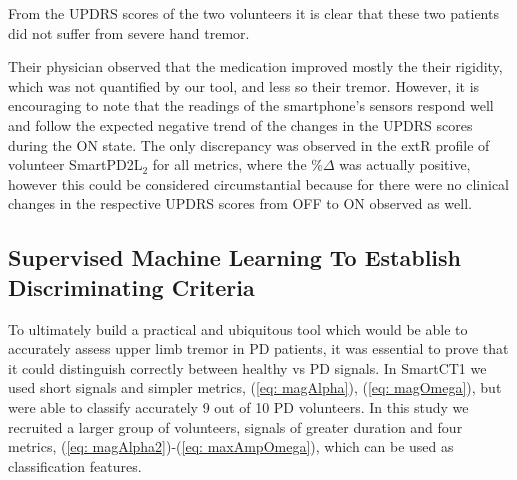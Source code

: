 From the \gls{UPDRS} scores of the two volunteers it is clear that these two patients did not suffer from severe hand tremor. 

Their physician observed that the medication improved mostly the their rigidity, which was not quantified by our tool, and less so their tremor. However, it is encouraging to note that the readings of the smartphone's sensors respond well and follow the expected negative trend of the changes in the \gls{UPDRS} scores during the ON state. The only discrepancy was observed in the extR profile of volunteer \gls{SmartPD2L}$_{2}$ for all metrics, where the $\% \Delta$ was actually positive, however this could be considered circumstantial because for there were no clinical changes in the respective \gls{UPDRS} scores from OFF to ON observed as well. 

\subsection{Supervised Machine Learning To Establish Discriminating Criteria}
\label{subsec:SmartCT2ML}
To ultimately build a practical and ubiquitous tool which would be able to accurately assess upper limb tremor in \gls{PD} patients, it was essential to prove that it could distinguish correctly between healthy vs \gls{PD} signals. In \gls{SmartCT1} we used short signals and simpler metrics, (\ref{eq: magAlpha}), (\ref{eq: magOmega}), but were able to classify accurately 9 out of 10 \gls{PD} volunteers. In this study we recruited a larger group of volunteers, signals of greater duration and four metrics, (\ref{eq: magAlpha2})-(\ref{eq: maxAmpOmega}), which can be used as classification features. 

